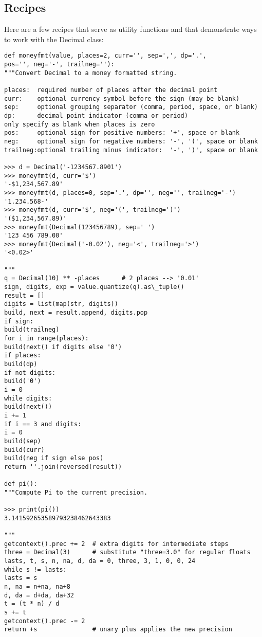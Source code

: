 \subsection{Recipes}

Here are a few recipes that serve as utility functions and that demonstrate ways to work with the Decimal class:

\begin{lstlisting}
def moneyfmt(value, places=2, curr='', sep=',', dp='.',
pos='', neg='-', trailneg=''):
"""Convert Decimal to a money formatted string.

places:  required number of places after the decimal point
curr:    optional currency symbol before the sign (may be blank)
sep:     optional grouping separator (comma, period, space, or blank)
dp:      decimal point indicator (comma or period)
only specify as blank when places is zero
pos:     optional sign for positive numbers: '+', space or blank
neg:     optional sign for negative numbers: '-', '(', space or blank
trailneg:optional trailing minus indicator:  '-', ')', space or blank

>>> d = Decimal('-1234567.8901')
>>> moneyfmt(d, curr='$')
'-$1,234,567.89'
>>> moneyfmt(d, places=0, sep='.', dp='', neg='', trailneg='-')
'1.234.568-'
>>> moneyfmt(d, curr='$', neg='(', trailneg=')')
'($1,234,567.89)'
>>> moneyfmt(Decimal(123456789), sep=' ')
'123 456 789.00'
>>> moneyfmt(Decimal('-0.02'), neg='<', trailneg='>')
'<0.02>'

"""
q = Decimal(10) ** -places      # 2 places --> '0.01'
sign, digits, exp = value.quantize(q).as\_tuple()
result = []
digits = list(map(str, digits))
build, next = result.append, digits.pop
if sign:
build(trailneg)
for i in range(places):
build(next() if digits else '0')
if places:
build(dp)
if not digits:
build('0')
i = 0
while digits:
build(next())
i += 1
if i == 3 and digits:
i = 0
build(sep)
build(curr)
build(neg if sign else pos)
return ''.join(reversed(result))

def pi():
"""Compute Pi to the current precision.

>>> print(pi())
3.141592653589793238462643383

"""
getcontext().prec += 2  # extra digits for intermediate steps
three = Decimal(3)      # substitute "three=3.0" for regular floats
lasts, t, s, n, na, d, da = 0, three, 3, 1, 0, 0, 24
while s != lasts:
lasts = s
n, na = n+na, na+8
d, da = d+da, da+32
t = (t * n) / d
s += t
getcontext().prec -= 2
return +s               # unary plus applies the new precision


\end{lstlisting}
